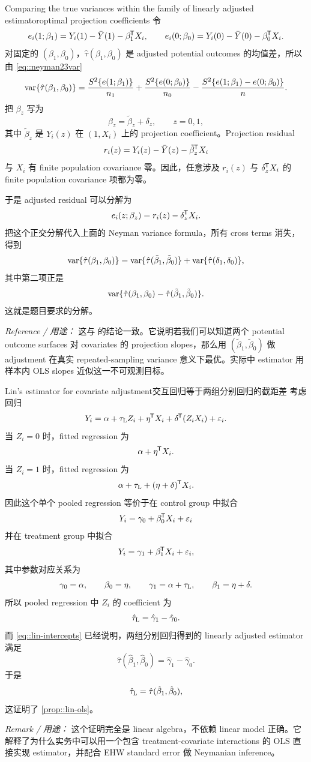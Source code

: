 \begin{exercisesolution}{Comparing the true variances within the family of linearly adjusted estimator}{optimal projection coefficients}
令
\[
e_i(1;\beta_1)=Y_i(1)-\bar Y(1)-\beta_1^{\mkern-1.5mu\mathsf{T}} X_i,\qquad
e_i(0;\beta_0)=Y_i(0)-\bar Y(0)-\beta_0^{\mkern-1.5mu\mathsf{T}} X_i.
\]
对固定的 $(\beta_1,\beta_0)$，$\hat{\tau}(\beta_1,\beta_0)$ 是 adjusted potential outcomes 的均值差，所以由 \cref{eq::neyman23var}
\[
\textup{var}\{\hat{\tau}(\beta_1,\beta_0)\}
=\frac{S^2\{e(1;\beta_1)\}}{n_1}
+\frac{S^2\{e(0;\beta_0)\}}{n_0}
-\frac{S^2\{e(1;\beta_1)-e(0;\beta_0)\}}{n}.
\]
把 $\beta_z$ 写为
\[
\beta_z=\tilde\beta_z+\delta_z,\qquad z=0,1,
\]
其中 $\tilde\beta_z$ 是 $Y_i(z)$ 在 $(1,X_i)$ 上的 projection coefficient。Projection residual
\[
r_i(z)=Y_i(z)-\bar Y(z)-\tilde\beta_z^{\mkern-1.5mu\mathsf{T}} X_i
\]
与 $X_i$ 有 finite population covariance 零。因此，任意涉及 $r_i(z)$ 与 $\delta_z^{\mkern-1.5mu\mathsf{T}} X_i$ 的 finite population covariance 项都为零。

于是 adjusted residual 可以分解为
\[
e_i(z;\beta_z)=r_i(z)-\delta_z^{\mkern-1.5mu\mathsf{T}} X_i.
\]
把这个正交分解代入上面的 Neyman variance formula，所有 cross terms 消失，得到
\[
\textup{var}\{\hat{\tau}(\beta_1,\beta_0)\}
=\textup{var}\{\hat{\tau}(\tilde\beta_1,\tilde\beta_0)\}
+\textup{var}\{\hat{\tau}(\delta_1,\delta_0)\},
\]
其中第二项正是
\[
\textup{var}\{\hat{\tau}(\beta_1,\beta_0)
-\hat{\tau}(\tilde\beta_1,\tilde\beta_0)\}.
\]
这就是题目要求的分解。

\emph{Reference / 用途：} 这与 \citet[][Example 9]{li2017general} 的结论一致。它说明若我们可以知道两个 potential outcome surfaces 对 covariates 的 projection slopes，那么用 $(\tilde\beta_1,\tilde\beta_0)$ 做 adjustment 在真实 repeated-sampling variance 意义下最优。实际中 \citet{lin2013} estimator 用样本内 OLS slopes 近似这一不可观测目标。
\end{exercisesolution}

\begin{exercisesolution}{Lin's estimator for covariate adjustment}{交互回归等于两组分别回归的截距差}
考虑回归
\[
Y_i=\alpha+\tau_{\textsc{L}}Z_i+\eta^{\mkern-1.5mu\mathsf{T}} X_i+\delta^{\mkern-1.5mu\mathsf{T}}(Z_iX_i)+\varepsilon_i.
\]
当 $Z_i=0$ 时，fitted regression 为
\[
\alpha+\eta^{\mkern-1.5mu\mathsf{T}} X_i.
\]
当 $Z_i=1$ 时，fitted regression 为
\[
\alpha+\tau_{\textsc{L}}+(\eta+\delta)^{\mkern-1.5mu\mathsf{T}} X_i.
\]
因此这个单个 pooled regression 等价于在 control group 中拟合
\[
Y_i=\gamma_0+\beta_0^{\mkern-1.5mu\mathsf{T}} X_i+\varepsilon_i
\]
并在 treatment group 中拟合
\[
Y_i=\gamma_1+\beta_1^{\mkern-1.5mu\mathsf{T}} X_i+\varepsilon_i,
\]
其中参数对应关系为
\[
\gamma_0=\alpha,\qquad \beta_0=\eta,\qquad
\gamma_1=\alpha+\tau_{\textsc{L}},\qquad
\beta_1=\eta+\delta.
\]
所以 pooled regression 中 $Z_i$ 的 coefficient 为
\[
\hat{\tau}_\textsc{L}=\hat\gamma_1-\hat\gamma_0.
\]
而 \cref{eq::lin-intercepts} 已经说明，两组分别回归得到的 linearly adjusted estimator 满足
\[
\hat{\tau}(\hat\beta_1,\hat\beta_0)=\hat\gamma_1-\hat\gamma_0.
\]
于是
\[
\hat{\tau}_\textsc{L}=\hat{\tau}(\hat\beta_1,\hat\beta_0),
\]
这证明了 \cref{prop::lin-ols}。

\emph{Remark / 用途：} 这个证明完全是 linear algebra，不依赖 linear model 正确。它解释了为什么实务中可以用一个包含 treatment-covariate interactions 的 OLS 直接实现 \citet{lin2013} estimator，并配合 EHW standard error 做 Neymanian inference。
\end{exercisesolution}

